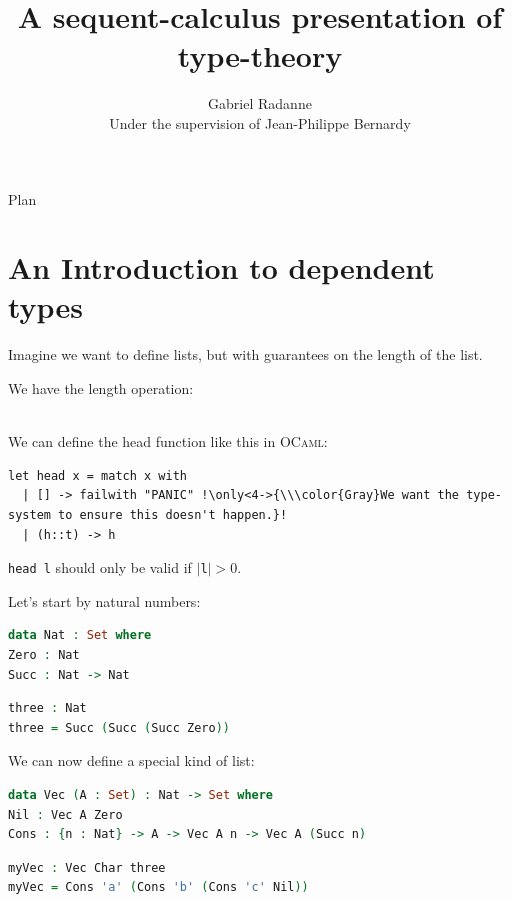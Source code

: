 \documentclass[xcolor=svgnames,11pt]{beamer}
\title{A sequent-calculus presentation of type-theory}
\author[Gabriel Radanne]{Gabriel Radanne\\ Under the supervision of Jean-Philippe Bernardy}
\institute[ENS Rennes]{ENS Rennes --- Chalmers University of Technology}
\newcommand{\mysc}[1]{\textsc{#1}\xspace}
\begin{document}
\begin{frame}[plain]
\titlepage
\end{frame}

\begin{frame}{Plan}
\tableofcontents%
\end{frame}

\section{An Introduction to dependent types}

\begin{frame}[fragile]
  Imagine we want to define lists, but with guarantees on the length of the list.

  We have the length operation:


  \pause\pause
  \ \\We can define the head function like this in \mysc{OCaml}:
\begin{lstlisting}[language=caml]
let head x = match x with
  | [] -> failwith "PANIC" !\only<4->{\\\color{Gray}We want the type-system to ensure this doesn't happen.}!
  | (h::t) -> h
\end{lstlisting}\pause

\lstinline[language=caml,basicstyle=\ttfamily]{head l}
should only be valid if $|$\lstinline[language=caml,basicstyle=\ttfamily]{l}$|>0$.
\end{frame}

\begin{frame}[fragile]
  Let's start by natural numbers:
\begin{lstlisting}[language=Agda]
data Nat : Set where
Zero : Nat
Succ : Nat -> Nat
\end{lstlisting}\pause

\begin{lstlisting}[language=Agda]
three : Nat
three = Succ (Succ (Succ Zero))
\end{lstlisting}\pause

  We can now define a special kind of list:
\begin{lstlisting}[language=Agda]
data Vec (A : Set) : Nat -> Set where
Nil : Vec A Zero
Cons : {n : Nat} -> A -> Vec A n -> Vec A (Succ n)
\end{lstlisting}\pause

\begin{lstlisting}[language=Agda]
myVec : Vec Char three
myVec = Cons 'a' (Cons 'b' (Cons 'c' Nil))
\end{lstlisting}

\end{frame}
\end{document}
